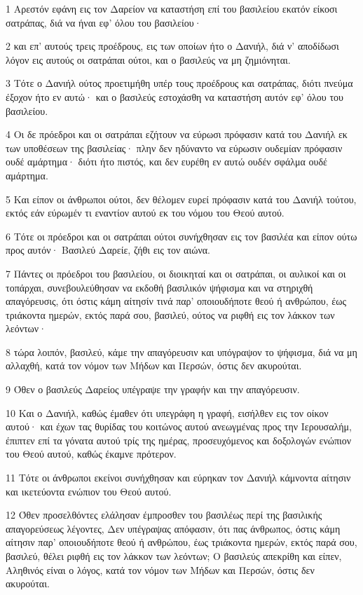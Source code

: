 \par 1 Αρεστόν εφάνη εις τον Δαρείον να καταστήση επί του βασιλείου εκατόν είκοσι σατράπας, διά να ήναι εφ' όλου του βασιλείου·
\par 2 και επ' αυτούς τρεις προέδρους, εις των οποίων ήτο ο Δανιήλ, διά ν' αποδίδωσι λόγον εις αυτούς οι σατράπαι ούτοι, και ο βασιλεύς να μη ζημιόνηται.
\par 3 Τότε ο Δανιήλ ούτος προετιμήθη υπέρ τους προέδρους και σατράπας, διότι πνεύμα έξοχον ήτο εν αυτώ· και ο βασιλεύς εστοχάσθη να καταστήση αυτόν εφ' όλου του βασιλείου.
\par 4 Οι δε πρόεδροι και οι σατράπαι εζήτουν να εύρωσι πρόφασιν κατά του Δανιήλ εκ των υποθέσεων της βασιλείας· πλην δεν ηδύναντο να εύρωσιν ουδεμίαν πρόφασιν ουδέ αμάρτημα· διότι ήτο πιστός, και δεν ευρέθη εν αυτώ ουδέν σφάλμα ουδέ αμάρτημα.
\par 5 Και είπον οι άνθρωποι ούτοι, δεν θέλομεν ευρεί πρόφασιν κατά του Δανιήλ τούτου, εκτός εάν εύρωμέν τι εναντίον αυτού εκ του νόμου του Θεού αυτού.
\par 6 Τότε οι πρόεδροι και οι σατράπαι ούτοι συνήχθησαν εις τον βασιλέα και είπον ούτω προς αυτόν· Βασιλεύ Δαρείε, ζήθι εις τον αιώνα.
\par 7 Πάντες οι πρόεδροι του βασιλείου, οι διοικηταί και οι σατράπαι, οι αυλικοί και οι τοπάρχαι, συνεβουλεύθησαν να εκδοθή βασιλικόν ψήφισμα και να στηριχθή απαγόρευσις, ότι όστις κάμη αίτησίν τινά παρ' οποιουδήποτε θεού ή ανθρώπου, έως τριάκοντα ημερών, εκτός παρά σου, βασιλεύ, ούτος να ριφθή εις τον λάκκον των λεόντων·
\par 8 τώρα λοιπόν, βασιλεύ, κάμε την απαγόρευσιν και υπόγραψον το ψήφισμα, διά να μη αλλαχθή, κατά τον νόμον των Μήδων και Περσών, όστις δεν ακυρούται.
\par 9 Όθεν ο βασιλεύς Δαρείος υπέγραψε την γραφήν και την απαγόρευσιν.
\par 10 Και ο Δανιήλ, καθώς έμαθεν ότι υπεγράφη η γραφή, εισήλθεν εις τον οίκον αυτού· και έχων τας θυρίδας του κοιτώνος αυτού ανεωγμένας προς την Ιερουσαλήμ, έπιπτεν επί τα γόνατα αυτού τρίς της ημέρας, προσευχόμενος και δοξολογών ενώπιον του Θεού αυτού, καθώς έκαμνε πρότερον.
\par 11 Τότε οι άνθρωποι εκείνοι συνήχθησαν και εύρηκαν τον Δανιήλ κάμνοντα αίτησιν και ικετεύοντα ενώπιον του Θεού αυτού.
\par 12 Όθεν προσελθόντες ελάλησαν έμπροσθεν του βασιλέως περί της βασιλικής απαγορεύσεως λέγοντες, Δεν υπέγραψας απόφασιν, ότι πας άνθρωπος, όστις κάμη αίτησιν παρ' οποιουδήποτε θεού ή ανθρώπου, έως τριάκοντα ημερών, εκτός παρά σου, βασιλεύ, θέλει ριφθή εις τον λάκκον των λεόντων; Ο βασιλεύς απεκρίθη και είπεν, Αληθινός είναι ο λόγος, κατά τον νόμον των Μήδων και Περσών, όστις δεν ακυρούται.
